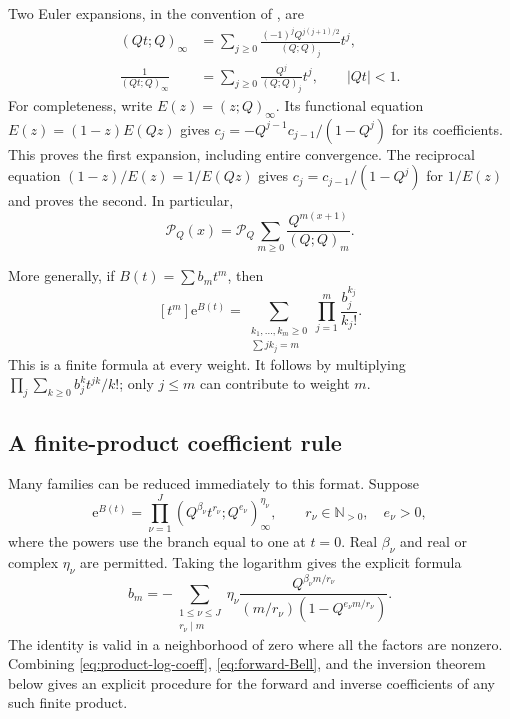 \documentclass[11pt]{article}
\numberwithin{equation}{section}
\theoremstyle{definition}
\newcommand{\N}{\mathbb N}
\newcommand{\coef}[2]{[#1^{#2}]}
\newcommand{\pp}[1]{(Q;Q)_{#1}}
\newcommand{\Pinf}{\mathcal P_Q}
\newcommand{\ee}{\mathrm e}
\begin{document}
Two Euler expansions, in the convention of \cite{dlmfq}, are
\begin{align}
 (Qt;Q)_\infty
 &=\sum_{j\ge0}\frac{(-1)^jQ^{j(j+1)/2}}{\pp{j}}t^j,
 \label{eq:euler-entire}\\
 \frac1{(Qt;Q)_\infty}
 &=\sum_{j\ge0}\frac{Q^j}{\pp{j}}t^j,
 \qquad |Qt|<1.
 \label{eq:euler-recip}
\end{align}
For completeness, write $E(z)=(z;Q)_\infty$. Its functional equation
$E(z)=(1-z)E(Qz)$ gives
$c_j=-Q^{j-1}c_{j-1}/(1-Q^j)$ for its coefficients. This proves the first expansion, including entire convergence. The reciprocal equation
$(1-z)/E(z)=1/E(Qz)$ gives $c_j=c_{j-1}/(1-Q^j)$ for $1/E(z)$ and proves the second. In particular,
\begin{equation}\label{eq:P-forward}
 \mathcal P_Q(x)=\Pinf\sum_{m\ge0}\frac{Q^{m(x+1)}}{\pp{m}}.
\end{equation}

More generally, if $B(t)=\sum b_m t^m$, then
\begin{equation}\label{eq:forward-Bell}
 \coef{t}{m}\ee^{B(t)}
 =\sum_{\substack{k_1,\ldots,k_m\ge0\\\sum j k_j=m}}
       \prod_{j=1}^m\frac{b_j^{k_j}}{k_j!}.
\end{equation}
This is a finite formula at every weight. It follows by multiplying
$\prod_j\sum_{k\ge0}b_j^k t^{jk}/k!$; only $j\le m$ can contribute to weight $m$.

\subsection{A finite-product coefficient rule}

Many families can be reduced immediately to this format. Suppose
\begin{equation}\label{eq:product-rule}
 \ee^{B(t)}=\prod_{\nu=1}^J
       (Q^{\beta_\nu}t^{r_\nu};Q^{e_\nu})_\infty^{\eta_\nu},
 \qquad r_\nu\in\N_{>0},\quad e_\nu>0,
\end{equation}
where the powers use the branch equal to one at $t=0$. Real $\beta_\nu$ and real or complex $\eta_\nu$ are permitted. Taking the logarithm gives the explicit formula
\begin{equation}\label{eq:product-log-coeff}
 b_m=-\sum_{\substack{1\le\nu\le J\\r_\nu\mid m}}
 \eta_\nu\frac{Q^{\beta_\nu m/r_\nu}}
 {(m/r_\nu)(1-Q^{e_\nu m/r_\nu})}.
\end{equation}
The identity is valid in a neighborhood of zero where all the factors are nonzero. Combining \eqref{eq:product-log-coeff}, \eqref{eq:forward-Bell}, and the inversion theorem below gives an explicit procedure for the forward and inverse coefficients of any such finite product.
\end{document}
